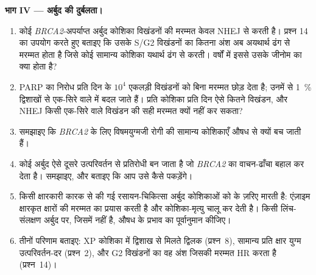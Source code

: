 \begin{problem}
\medskip
\noindent\textbf{भाग IV --- अर्बुद की दुर्बलता।}
\begin{enumerate}[resume]
  \item कोई \emph{BRCA2}-अपर्याप्त अर्बुद कोशिका विखंडनों की मरम्मत
        केवल NHEJ से करती है। प्रश्न 14 का उपयोग करते हुए बताइए कि
        उसके S/G2 विखंडनों का कितना अंश अब अयथार्थ ढंग से मरम्मत होता
        है जिसे कोई सामान्य कोशिका यथार्थ ढंग से करती। वर्षों में इससे
        उसके जीनोम का क्या होता है?
  \item PARP का निरोध प्रति दिन के $10^{4}$ एकलड़ी विखंडनों को
        बिना मरम्मत छोड़ देता है; उनमें से \qty{1}{\%} द्विशाखों से
        एक-सिरे वाले  में बदल जाते हैं। प्रति कोशिका
        प्रति दिन ऐसे कितने विखंडन, और NHEJ किसी एक-सिरे वाले विखंडन
        की सही मरम्मत क्यों नहीं कर सकता?
  \item समझाइए कि \emph{BRCA2} के लिए विषमयुग्मजी रोगी की सामान्य
        कोशिकाएँ औषध से क्यों बच जाती हैं।
  \item कोई अर्बुद ऐसे दूसरे उत्परिवर्तन से प्रतिरोधी बन जाता है जो
        \emph{BRCA2} का वाचन-ढाँचा बहाल कर देता है। समझाइए, और बताइए
        कि आप उसे कैसे पकड़ेंगे।
  \item किसी क्षारकारी कारक से की गई रसायन-चिकित्सा अर्बुद कोशिकाओं को
         के ज़रिए मारती है: एंज़ाइम क्षारकृत क्षारों की
        मरम्मत का प्रयास करती है और कोशिका-मृत्यु चालू कर देती है।
        किसी लिंच-संलक्षण अर्बुद पर, जिसमें  नहीं है,
        औषध के प्रभाव का पूर्वानुमान कीजिए।
  \item तीनों परिणाम बताइए: XP कोशिका में द्विशाख से मिलते द्विलक
        (प्रश्न~8), सामान्य प्रति क्षार युग्म उत्परिवर्तन-दर
        (प्रश्न~2), और G2 विखंडनों का वह अंश जिसकी मरम्मत HR करता है
        (प्रश्न~14)।
\end{enumerate}
\end{problem}
